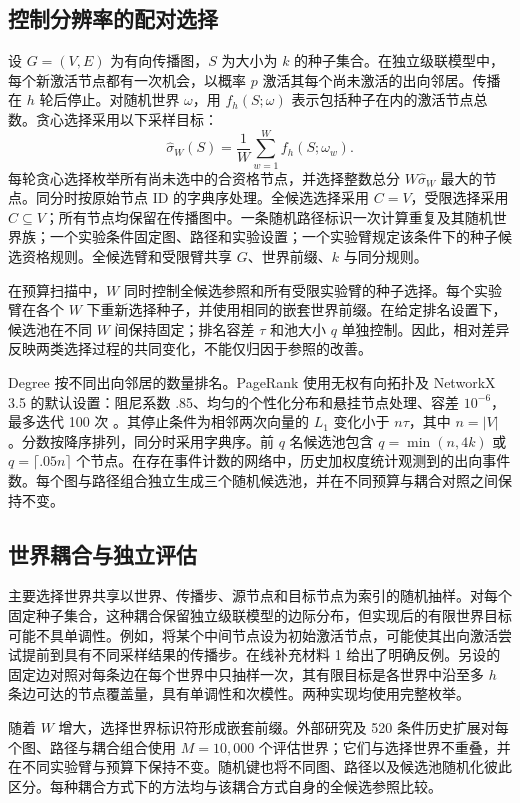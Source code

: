 \documentclass[smallextended]{svjour3}
\begin{document}
\subsection{控制分辨率的配对选择}
设 $G=(V,E)$ 为有向传播图，$S$ 为大小为 $k$ 的种子集合。在独立级联模型中，每个新激活节点都有一次机会，以概率 $p$ 激活其每个尚未激活的出向邻居。传播在 $h$ 轮后停止。对随机世界 $\omega$，用 $f_h(S;\omega)$ 表示包括种子在内的激活节点总数。贪心选择采用以下采样目标：
\begin{equation}
\widehat\sigma_W(S)=\frac{1}{W}\sum_{w=1}^{W}f_h(S;\omega_w).
\end{equation}
每轮贪心选择枚举所有尚未选中的合资格节点，并选择整数总分 $W\widehat\sigma_W$ 最大的节点。同分时按原始节点 ID 的字典序处理。全候选选择采用 $C=V$，受限选择采用 $C\subseteq V$；所有节点均保留在传播图中。一条随机路径标识一次计算重复及其随机世界族；一个实验条件固定图、路径和实验设置；一个实验臂规定该条件下的种子候选资格规则。全候选臂和受限臂共享 $G$、世界前缀、$k$ 与同分规则。

在预算扫描中，$W$ 同时控制全候选参照和所有受限实验臂的种子选择。每个实验臂在各个 $W$ 下重新选择种子，并使用相同的嵌套世界前缀。在给定排名设置下，候选池在不同 $W$ 间保持固定；排名容差 $\tau$ 和池大小 $q$ 单独控制。因此，相对差异反映两类选择过程的共同变化，不能仅归因于参照的改善。

Degree 按不同出向邻居的数量排名。PageRank 使用无权有向拓扑及 NetworkX 3.5 的默认设置：阻尼系数 .85、均匀的个性化分布和悬挂节点处理、容差 $10^{-6}$，最多迭代 100 次 \cite{networkxpr}。其停止条件为相邻两次向量的 $L_1$ 变化小于 $n\tau$，其中 $n=|V|$。分数按降序排列，同分时采用字典序。前 $q$ 名候选池包含 $q=\min(n,4k)$ 或 $q=\lceil .05n\rceil$ 个节点。在存在事件计数的网络中，历史加权度统计观测到的出向事件数。每个图与路径组合独立生成三个随机候选池，并在不同预算与耦合对照之间保持不变。

\subsection{世界耦合与独立评估}\label{sec:coupling}
主要选择世界共享以世界、传播步、源节点和目标节点为索引的随机抽样。对每个固定种子集合，这种耦合保留独立级联模型的边际分布，但实现后的有限世界目标可能不具单调性。例如，将某个中间节点设为初始激活节点，可能使其出向激活尝试提前到具有不同采样结果的传播步。在线补充材料 1 给出了明确反例。另设的固定边对照对每条边在每个世界中只抽样一次，其有限目标是各世界中沿至多 $h$ 条边可达的节点覆盖量，具有单调性和次模性。两种实现均使用完整枚举。

随着 $W$ 增大，选择世界标识符形成嵌套前缀。外部研究及 520 条件历史扩展对每个图、路径与耦合组合使用 $M=10,000$ 个评估世界；它们与选择世界不重叠，并在不同实验臂与预算下保持不变。随机键也将不同图、路径以及候选池随机化彼此区分。每种耦合方式下的方法均与该耦合方式自身的全候选参照比较。
\end{document}
